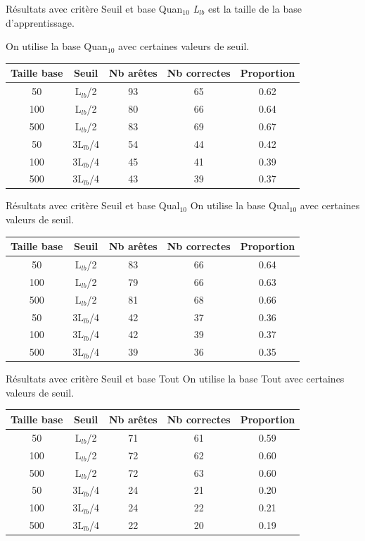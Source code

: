 \documentclass{beamer}
\begin{document}
\begin{frame}{Résultats avec critère Seuil et base Quan$_{10}$}
\emph{L$_{lb}$} est la taille de la base d'apprentissage. 


On utilise la base Quan$_{10}$ avec certaines valeurs de seuil.

\begin{tabular}{|c|c|c|c|c|}
   \hline
   Taille base & Seuil & Nb arêtes & Nb correctes & Proportion\\
   \hline
   50 & L$_{lb}$/2 & 93 & 65 & 0.62  \\   
   \hline
   100 & L$_{lb}$/2 & 80 & 66 & 0.64  \\
   \hline
   500 & L$_{lb}$/2 & 83 & 69 & 0.67  \\
   \hline
   \hline
   50 & 3L$_{lb}$/4 & 54 & 44 & 0.42  \\
   \hline
   100 & 3L$_{lb}$/4 & 45 & 41 & 0.39  \\
   \hline
   500 & 3L$_{lb}$/4 & 43 & 39 & 0.37  \\
   \hline
\end{tabular}


\end{frame}

\begin{frame}{Résultats avec critère Seuil et base Qual$_{10}$}
On utilise la base Qual$_{10}$ avec certaines valeurs de seuil.
\begin{tabular}{|c|c|c|c|c|}
   \hline
   Taille base & Seuil & Nb arêtes & Nb correctes & Proportion\\
    \hline
   50 & L$_{lb}$/2 & 83 & 66 & 0.64  \\
   \hline
   100 & L$_{lb}$/2 & 79 & 66 & 0.63  \\
   \hline
   500 & L$_{lb}$/2 & 81 & 68 & 0.66  \\
   \hline
   \hline
   50 & 3L$_{lb}$/4 & 42 & 37 & 0.36  \\
   \hline
   100 & 3L$_{lb}$/4 & 42 & 39 & 0.37  \\
   \hline
   500 & 3L$_{lb}$/4 & 39 & 36 & 0.35  \\
   \hline
\end{tabular}
\end{frame}

\begin{frame}{Résultats avec critère Seuil et base Tout}
On utilise la base Tout avec certaines valeurs de seuil.
\begin{tabular}{|c|c|c|c|c|}
   \hline
   Taille base & Seuil & Nb arêtes & Nb correctes & Proportion\\
   \hline
   50 & L$_{lb}$/2 & 71 & 61 & 0.59  \\
   \hline
   100 & L$_{lb}$/2 & 72 & 62 & 0.60  \\
   \hline
   500 & L$_{lb}$/2 & 72 & 63 & 0.60  \\
   \hline
   \hline
   50 & 3L$_{lb}$/4 & 24 & 21 & 0.20  \\
   \hline
   100 & 3L$_{lb}$/4 & 24 & 22 & 0.21  \\
   \hline
   500 & 3L$_{lb}$/4 & 22 & 20 & 0.19  \\
   \hline
\end{tabular}
\end{frame}
\end{document}
